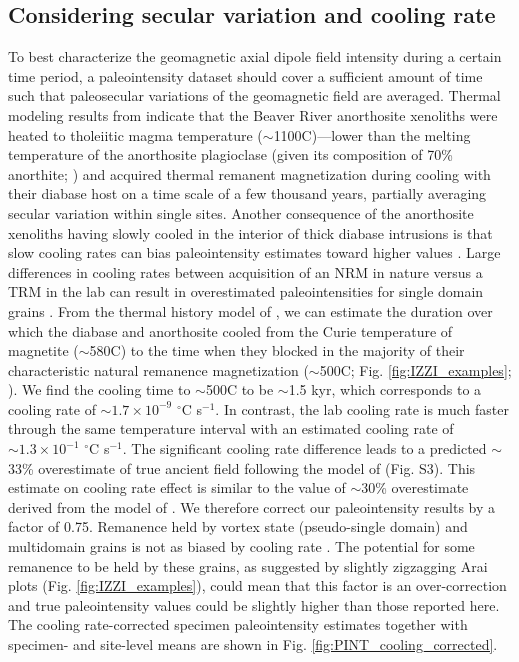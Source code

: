 \subsection*{Considering secular variation and cooling rate}
To best characterize the geomagnetic axial dipole field intensity during a certain time period, a paleointensity dataset should cover a sufficient amount of time such that paleosecular variations of the geomagnetic field are averaged. Thermal modeling results from \citealp{Zhang2021b} indicate that the Beaver River anorthosite xenoliths were heated to tholeiitic magma temperature ($\sim$1100\textdegree C)---lower than the melting temperature of the anorthosite plagioclase (given its composition of 70\% anorthite; \citealp{Morrison1983a, Doyle2016a}) and acquired thermal remanent magnetization during cooling with their diabase host on a time scale of a few thousand years, partially averaging secular variation within single sites. Another consequence of the anorthosite xenoliths having slowly cooled in the interior of thick diabase intrusions is that slow cooling rates can bias paleointensity estimates toward higher values \citep{Halgedahl1980a}. Large differences in cooling rates between acquisition of an NRM in nature versus a TRM in the lab can result in overestimated paleointensities for single domain grains \citep{Dodson1980a, Halgedahl1980a, Nagy2021a}. From the thermal history model of \citep{Zhang2021b}, we can estimate the duration over which the diabase and anorthosite cooled from the Curie temperature of magnetite ($\sim$580\textdegree C) to the time when they blocked in the majority of their characteristic natural remanence magnetization ($\sim$500\textdegree  C; Fig. \ref{fig:IZZI_examples}; \citealp{Zhang2021b}). We find the cooling time to $\sim$500\textdegree C to be $\sim$1.5 kyr, which corresponds to a cooling rate of $\sim1.7\times10^{-9}$ $^\circ$C s$^{-1}$. In contrast, the lab cooling rate is much faster through the same temperature interval with an estimated cooling rate of $\sim1.3\times10^{-1}$ $^\circ$C s$^{-1}$. The significant cooling rate difference leads to a predicted $\sim$33\% overestimate of true ancient field following the model of \citealp{Halgedahl1980a} (Fig. S3). This estimate on cooling rate effect is similar to the value of $\sim$30\% overestimate derived from the model of \citealp{Nagy2021a}. We therefore correct our paleointensity results by a factor of 0.75. Remanence held by vortex state (pseudo-single domain) and multidomain grains is not as biased by cooling rate \citep{Biggin2013a}. The potential for some remanence to be held by these grains, as suggested by slightly zigzagging Arai plots (Fig. \ref{fig:IZZI_examples}), could mean that this factor is an over-correction and true paleointensity values could be slightly higher than those reported here. The cooling rate-corrected specimen paleointensity estimates together with specimen- and site-level means are shown in Fig. \ref{fig:PINT_cooling_corrected}.

